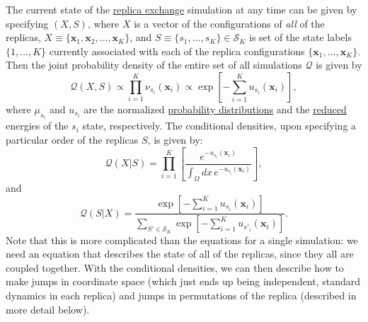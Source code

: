 \documentclass[9pt,review]{livecoms}
\newcommand{\vx}{\mathbf{x}}
\begin{document}
The current state of the \hyperlink{ref:ReplEx} {replica exchange} simulation at any time can be given by specifying $(X,S)$, where $X$ is a vector of the configurations of \emph{all} of the replicas, $X \equiv \{\vx_1, \vx_2, \ldots, \vx_K\}$, and $S \equiv\{s_1,\ldots,s_K\} \in \mathcal{S}_K$ is set of the state labels $\{1, \ldots, K\}$ currently associated with each of the replica configurations $\{\vx_1, \ldots, \vx_K\}$. Then the joint probability density of the entire set of all simulations $\mathcal{Q}$ is given by
\begin{equation}
\mathcal{Q}(X, S) \propto \prod_{i=1}^{K} \nu_{s_i}(\vx_i) \propto \exp\left[-\sum_{i=1}^K u_{s_i}(\vx_i)\right],
\label{eq:parallereplica}
\end{equation}
where $\mu_{s_i}$ and $u_{s_i}$ are the normalized \hyperlink{ref:Distribution}{probability distributions} and the \hyperlink{ref:reduced}{reduced} energies of the $s_i$ state, respectively.
The conditional densities, upon specifying a particular order of the replicas $S$, is given by:
\begin{equation}
\mathcal{Q}(X | S) = \prod_{i=1}^K \left[ \frac{e^{-u_{s_i}(\vx_i)}}{\int_\Omega dx \, e^{-u_{s_i}(\vx_i)}}\right],
\end{equation}
and
\begin{equation}
\mathcal{Q}(S | X) = \frac{\exp\left[- \sum\limits_{i=1}^K u_{s_i}(\vx_i) \right]}{\sum\limits_{S' \in \mathcal{S}_K} \exp\left[- \sum\limits_{i=1}^K u_{s'_i}(\vx_i) \right]}.
\end{equation}
Note that this is more complicated than the equations for a single simulation: we need an equation that describes the state of all of the replicas, since they all are coupled together. With the conditional densities, we can then describe how to make jumps in coordinate space (which just ends up being independent, standard dynamics in each replica) and jumps in permutations of the replica (described in more detail below).
\end{document}
